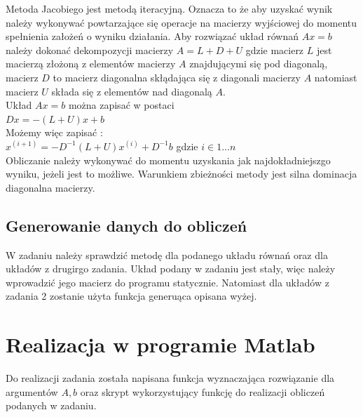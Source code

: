 \documentclass[a4paper, 11pt]{article}
\begin{document}
Metoda Jacobiego jest metodą iteracyjną. Oznacza to że aby uzyskać wynik należy wykonywać powtarzające się operacje na macierzy wyjściowej do momentu spełnienia założeń o wyniku działania. Aby rozwiązać układ równań $Ax=b$ należy dokonać dekompozycji macierzy $A = L+D+U$ gdzie macierz $L$ jest macierzą złożoną z elementów macierzy $A$ znajdującymi się pod diagonalą, macierz $D$ to macierz diagonalna skłądająca się z diagonali macierzy $A$ natomiast macierz $U$ składa się z elementów nad diagonalą $A$. \\
Układ $Ax=b$ można zapisać w postaci\\

\hspace{1cm} $Dx = -(L+U)x +b$ \\

Możemy więc zapisać :\\

\hspace{1cm} $x^{(i+1)} = -D^{-1}(L+U)x^{(i)} + D^{-1}b$ gdzie $i \in 1...n$\\

Obliczanie należy wykonywać do momentu uzyskania jak najdokładniejszgo wyniku, jeżeli jest to możliwe. Warunkiem zbieżności metody jest silna dominacja diagonalna macierzy. ~\cite{sixth}

\subsection{Generowanie danych do obliczeń}
\indent

W zadaniu należy sprawdzić metodę dla podanego układu równań oraz dla układów z drugirgo zadania. 
Układ podany w zadaniu jest stały, więc należy wprowadzić jego macierz do programu statycznie. Natomiast dla układów z zadania 2 zostanie użyta funkcja generuąca opisana wyżej. 

\section{Realizacja w programie Matlab}
\indent

Do realizacji zadania została napisana funkcja wyznaczająca rozwiązanie dla argumentów $A,b$ oraz skrypt wykorzystujący funkcję do realizacji obliczeń podanych w zadaniu.
\end{document}
